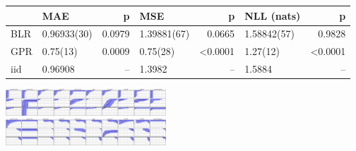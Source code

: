 \documentclass[a0,landscape]{a0poster}
\begin{document}
\begin{multicols}{2}
\begin{tabular}{|l|l|r|l|r|l|r|}
\toprule
{}  &        {MAE} &     {p} &        {MSE} &      {p} & {NLL (nats)} &      {p} \\
\midrule
BLR &  0.96933(30) &  0.0979 &  1.39881(67) &   0.0665 &  1.58842(57) &   0.9828 \\
GPR &  0.75(13)    &  0.0009 &  0.75(28)    &  <0.0001 &  1.27(12)    &  <0.0001 \\
iid &  0.96908     &    {--} &  1.3982      &     {--} &  1.5884      &     {--} \\
\bottomrule
\end{tabular}

\includegraphics[width=0.45\textwidth]{AUC.png}\\
\includegraphics[width=0.45\textwidth]{AP.png}
\end{multicols}
\end{document}
